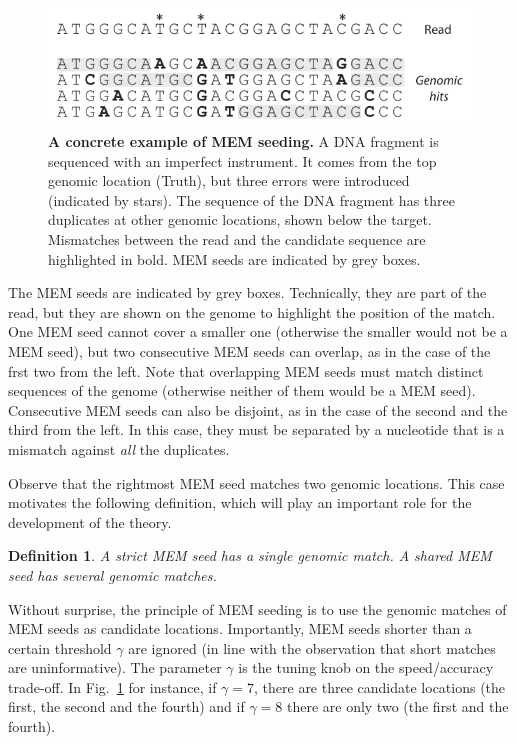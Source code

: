 \documentclass{article}
\newtheorem{definition}{Definition}
\begin{document}
\begin{figure}[h]
\centering
\includegraphics[scale=1]{MEM_example.pdf}
\caption{\textbf{A concrete example of MEM seeding.}
A DNA fragment is sequenced with an imperfect instrument. It comes from
the top genomic location (Truth), but three errors were introduced
(indicated by stars). The sequence of the DNA fragment has three
duplicates at other genomic locations, shown below the target. Mismatches
between the read and the candidate sequence are highlighted in bold. MEM
seeds are indicated by grey boxes.}
\label{fig:MEM_example}
\end{figure}

The MEM seeds are indicated by grey boxes. Technically, they are part of
the read, but they are shown on the genome to highlight the position of
the match. One MEM seed cannot cover a smaller one (otherwise the smaller
would not be a MEM seed), but two consecutive MEM seeds can overlap, as in
the case of the frst two from the left. Note that overlapping MEM seeds
must match distinct sequences of the genome (otherwise neither of them
would be a MEM seed). Consecutive MEM seeds can also be disjoint, as in
the case of the second and the third from the left. In this case, they
must be separated by a nucleotide that is a mismatch against \emph{all}
the duplicates.

Observe that the rightmost MEM seed matches two genomic locations. This
case motivates the following definition, which will play an important role
for the development of the theory.

\begin{definition}
A \emph{strict} MEM seed has a single genomic match.
A \emph{shared} MEM seed has several genomic matches.
\end{definition}

Without surprise, the principle of MEM seeding is to use the genomic
matches of MEM seeds as candidate locations. Importantly, MEM seeds
shorter than a certain threshold $\gamma$ are ignored (in line with the
observation that short matches are uninformative). The parameter $\gamma$
is the tuning knob on the speed/accuracy trade-off. In
Fig.~\ref{fig:MEM_example} for instance, if $\gamma = 7$, there are three
candidate locations (the first, the second and the fourth) and if $\gamma
= 8$ there are only two (the first and the fourth).
\end{document}
